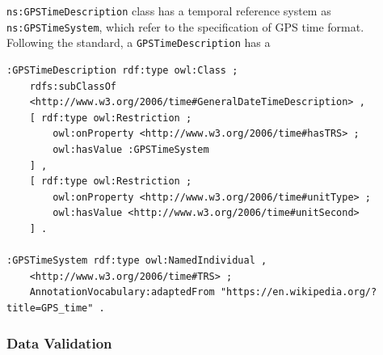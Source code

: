 \texttt{ns:GPSTimeDescription} class has a temporal reference system as \texttt{ns:GPSTimeSystem}, which refer to the specification of GPS time format. Following the standard, a \texttt{GPSTimeDescription} has a 

\begin{verbatim}
:GPSTimeDescription rdf:type owl:Class ;
    rdfs:subClassOf 
    <http://www.w3.org/2006/time#GeneralDateTimeDescription> ,
    [ rdf:type owl:Restriction ;
        owl:onProperty <http://www.w3.org/2006/time#hasTRS> ;
        owl:hasValue :GPSTimeSystem
    ] ,
    [ rdf:type owl:Restriction ;
        owl:onProperty <http://www.w3.org/2006/time#unitType> ;
        owl:hasValue <http://www.w3.org/2006/time#unitSecond>
    ] .    

:GPSTimeSystem rdf:type owl:NamedIndividual ,
    <http://www.w3.org/2006/time#TRS> ;
    AnnotationVocabulary:adaptedFrom "https://en.wikipedia.org/?title=GPS_time" .
\end{verbatim}


\subsubsection*{Data Validation}


